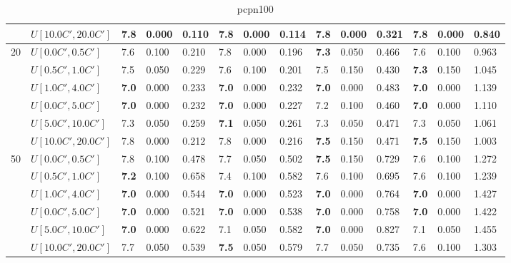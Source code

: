 \begin{table}[h]
{\begin{tabular}{|l|l||l|l|l||l|l|l||l|l|l||l|l|l|}
       & $U[10.0C',20.0C']$ & \textbf{7.8} & 0.000 & 0.110 & \textbf{7.8} & 0.000 & 0.114 & \textbf{7.8} & 0.000 & 0.321 & \textbf{7.8} & 0.000 & 0.840 \\
      \hline\hline
      \multirow{6}{*}{20} & $U[0.0C',0.5C']$ & 7.6 & 0.100 & 0.210 & 7.8 & 0.000 & 0.196 & \textbf{7.3} & 0.050 & 0.466 & 7.6 & 0.100 & 0.963 \\
       & $U[0.5C',1.0C']$ & 7.5 & 0.050 & 0.229 & 7.6 & 0.100 & 0.201 & 7.5 & 0.150 & 0.430 & \textbf{7.3} & 0.150 & 1.045 \\
       & $U[1.0C',4.0C']$ & \textbf{7.0} & 0.000 & 0.233 & \textbf{7.0} & 0.000 & 0.232 & \textbf{7.0} & 0.000 & 0.483 & \textbf{7.0} & 0.000 & 1.139 \\
       & $U[0.0C',5.0C']$ & \textbf{7.0} & 0.000 & 0.232 & \textbf{7.0} & 0.000 & 0.227 & 7.2 & 0.100 & 0.460 & \textbf{7.0} & 0.000 & 1.110 \\
       & $U[5.0C',10.0C']$ & 7.3 & 0.050 & 0.259 & \textbf{7.1} & 0.050 & 0.261 & 7.3 & 0.050 & 0.471 & 7.3 & 0.050 & 1.061 \\
       & $U[10.0C',20.0C']$ & 7.8 & 0.000 & 0.212 & 7.8 & 0.000 & 0.216 & \textbf{7.5} & 0.150 & 0.471 & \textbf{7.5} & 0.150 & 1.003 \\
      \hline\hline
      \multirow{6}{*}{50} & $U[0.0C',0.5C']$ & 7.8 & 0.100 & 0.478 & 7.7 & 0.050 & 0.502 & \textbf{7.5} & 0.150 & 0.729 & 7.6 & 0.100 & 1.272 \\
       & $U[0.5C',1.0C']$ & \textbf{7.2} & 0.100 & 0.658 & 7.4 & 0.100 & 0.582 & 7.6 & 0.100 & 0.695 & 7.6 & 0.100 & 1.239 \\
       & $U[1.0C',4.0C']$ & \textbf{7.0} & 0.000 & 0.544 & \textbf{7.0} & 0.000 & 0.523 & \textbf{7.0} & 0.000 & 0.764 & \textbf{7.0} & 0.000 & 1.427 \\
       & $U[0.0C',5.0C']$ & \textbf{7.0} & 0.000 & 0.521 & \textbf{7.0} & 0.000 & 0.538 & \textbf{7.0} & 0.000 & 0.758 & \textbf{7.0} & 0.000 & 1.422 \\
       & $U[5.0C',10.0C']$ & \textbf{7.0} & 0.000 & 0.622 & 7.1 & 0.050 & 0.582 & \textbf{7.0} & 0.000 & 0.827 & 7.1 & 0.050 & 1.455 \\
       & $U[10.0C',20.0C']$ & 7.7 & 0.050 & 0.539 & \textbf{7.5} & 0.050 & 0.579 & 7.7 & 0.050 & 0.735 & 7.6 & 0.100 & 1.303 \\
      \hline
      \end{tabular}
      }
      \caption{pcpn100}
      \label{tab:pcpn100}\end{table}


